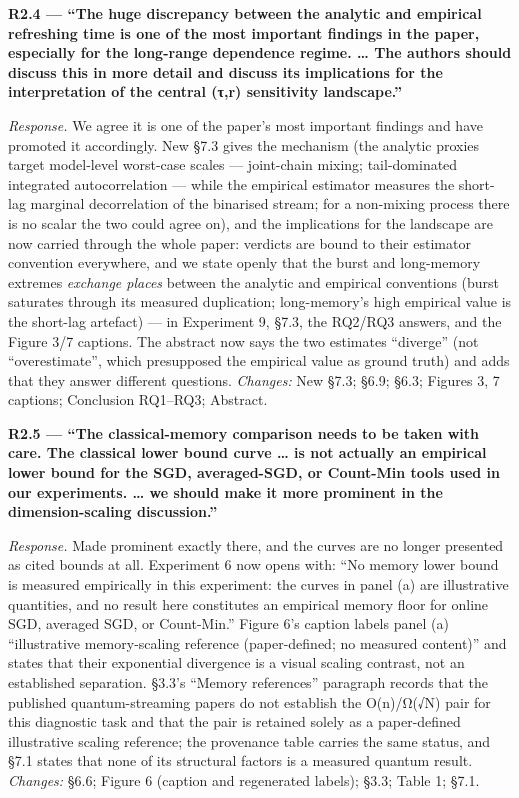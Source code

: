 \documentclass[
  11pt,
]{article}
\begin{document}
\textbf{R2.4 --- ``The huge discrepancy between the analytic and
empirical refreshing time is one of the most important findings in the
paper, especially for the long-range dependence regime. \ldots{} The
authors should discuss this in more detail and discuss its implications
for the interpretation of the central (τ,r) sensitivity landscape.''}

\emph{Response.} We agree it is one of the paper's most important
findings and have promoted it accordingly. New §7.3 gives the mechanism
(the analytic proxies target model-level worst-case scales ---
joint-chain mixing; tail-dominated integrated autocorrelation --- while
the empirical estimator measures the short-lag marginal decorrelation of
the binarised stream; for a non-mixing process there is no scalar the
two could agree on), and the implications for the landscape are now
carried through the whole paper: verdicts are bound to their estimator
convention everywhere, and we state openly that the burst and
long-memory extremes \emph{exchange places} between the analytic and
empirical conventions (burst saturates through its measured duplication;
long-memory's high empirical value is the short-lag artefact) --- in
Experiment 9, §7.3, the RQ2/RQ3 answers, and the Figure 3/7 captions.
The abstract now says the two estimates ``diverge'' (not
``overestimate'', which presupposed the empirical value as ground truth)
and adds that they answer different questions. \emph{Changes:} New §7.3;
§6.9; §6.3; Figures 3, 7 captions; Conclusion RQ1--RQ3; Abstract.

\textbf{R2.5 --- ``The classical-memory comparison needs to be taken
with care. The classical lower bound curve \ldots{} is not actually an
empirical lower bound for the SGD, averaged-SGD, or Count-Min tools used
in our experiments. \ldots{} we should make it more prominent in the
dimension-scaling discussion.''}

\emph{Response.} Made prominent exactly there, and the curves are no
longer presented as cited bounds at all. Experiment 6 now opens with:
``No memory lower bound is measured empirically in this experiment: the
curves in panel (a) are illustrative quantities, and no result here
constitutes an empirical memory floor for online SGD, averaged SGD, or
Count-Min.'' Figure 6's caption labels panel (a) ``illustrative
memory-scaling reference (paper-defined; no measured content)'' and
states that their exponential divergence is a visual scaling contrast,
not an established separation. §3.3's ``Memory references'' paragraph
records that the published quantum-streaming papers do not establish the
O(n)/Ω(√N) pair for this diagnostic task and that the pair is retained
solely as a paper-defined illustrative scaling reference; the provenance
table carries the same status, and §7.1 states that none of its
structural factors is a measured quantum result. \emph{Changes:} §6.6;
Figure 6 (caption and regenerated labels); §3.3; Table 1; §7.1.
\end{document}
